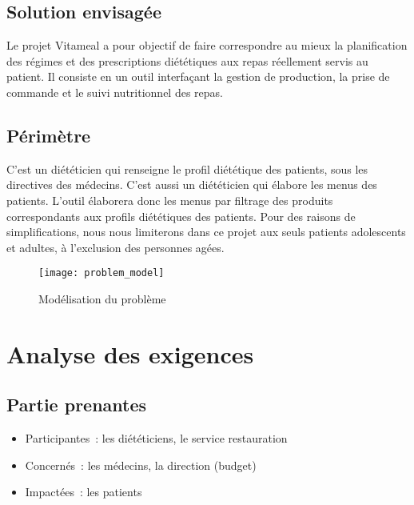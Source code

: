 \subsection{Solution envisagée}
Le projet Vitameal a pour objectif de faire correspondre au mieux la planification des régimes et des
prescriptions diététiques aux repas réellement servis au patient. Il consiste en un outil interfaçant la
gestion de production, la prise de commande et le suivi nutritionnel des repas.

\subsection{Périmètre}
C'est un diététicien qui renseigne le profil diététique des patients,
sous les directives des médecins. C'est aussi un diététicien qui élabore
les menus des patients. L'outil élaborera donc
les menus par filtrage des produits correspondants aux profils
diététiques des patients. Pour des raisons de simplifications, nous nous limiterons dans ce projet aux seuls patients adolescents et adultes, à l'exclusion des personnes agées.
\begin{figure}[H]
\label{Modelisation_du _probleme}
  \centering
      \texttt{[image: problem\_model]} %
\caption{Modélisation du problème}
\end{figure}

\section{Analyse des exigences}
\subsection{Partie prenantes}
\begin{itemize}
\item Participantes~: les diététiciens, le service restauration
\item Concernés~: les médecins, la direction (budget)
\item Impactées~: les patients
\end{itemize}

